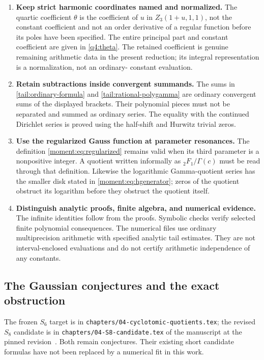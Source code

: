 \documentclass[11pt,a4paper]{article}
\numberwithin{equation}{section}
\theoremstyle{definition}
\theoremstyle{remark}
\begin{document}
\begin{enumerate}
\item \textbf{Keep strict harmonic coordinates named and normalized.}
The quartic coefficient $\theta$ is the coefficient of $u$ in
$Z_3(1+u,1,1)$, not the constant coefficient and not an order
derivative of a regular function before its poles have been
specified. The entire principal part and constant coefficient
are given in \eqref{q4:theta}. The retained coefficient is
genuine remaining arithmetic data in the present reduction;
its integral representation is a normalization, not an ordinary-
constant evaluation.

\item \textbf{Retain subtractions inside convergent summands.}
The sums in \eqref{tail:ordinary-formula} and
\eqref{tail:rational-polygamma} are ordinary convergent sums of
the displayed brackets. Their polynomial pieces must not be
separated and summed as ordinary series. The equality with the
continued Dirichlet series is proved using the half-shift and
Hurwitz trivial zeros.

\item \textbf{Use the regularized Gauss function at parameter resonances.}
The definition \eqref{moment:eq:regularized} remains valid when
its third parameter is a nonpositive integer. A quotient written
informally as ${}_2F_1/\Gamma(c)$ must be read through that
definition. Likewise the logarithmic Gamma-quotient series has
the smaller disk stated in \eqref{moment:eq:hgenerator}; zeros
of the quotient obstruct its logarithm before they obstruct
the quotient itself.

\item \textbf{Distinguish analytic proofs, finite algebra, and numerical evidence.}
The infinite identities follow from the proofs. Symbolic checks
verify selected finite polynomial consequences. The numerical
files use ordinary multiprecision arithmetic with specified
analytic tail estimates. They are not interval-enclosed evaluations
and do not certify arithmetic independence of any constants.
\end{enumerate}

\subsection{The Gaussian conjectures and the exact obstruction}

The frozen $S_6$ target is in
\texttt{chapters/04-cyclotomic-quotients.tex}; the revised $S_8$
candidate is in \texttt{chapters/04-S8-candidate.tex} of the
manuscript at the pinned revision~\cite{ProveIt}. Both remain
conjectures. Their existing short candidate formulas have not
been replaced by a numerical fit in this work.
\end{document}
